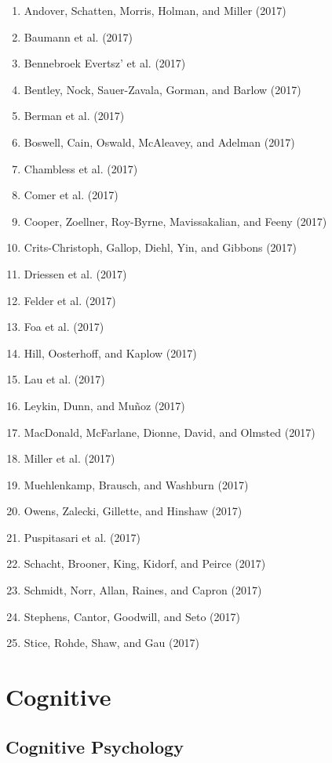 \documentclass[english,man]{apa6}
\providecommand{\tightlist}{%
  \setlength{\itemsep}{0pt}\setlength{\parskip}{0pt}}
\begin{document}
\begin{enumerate}
\def\labelenumi{\arabic{enumi})}
\tightlist
\item
  Andover, Schatten, Morris, Holman, and Miller (2017)
\item
  Baumann et al. (2017)
\item
  Bennebroek Evertsz' et al. (2017)
\item
  Bentley, Nock, Sauer-Zavala, Gorman, and Barlow (2017)
\item
  Berman et al. (2017)
\item
  Boswell, Cain, Oswald, McAleavey, and Adelman (2017)
\item
  Chambless et al. (2017)
\item
  Comer et al. (2017)
\item
  Cooper, Zoellner, Roy-Byrne, Mavissakalian, and Feeny (2017)
\item
  Crits-Christoph, Gallop, Diehl, Yin, and Gibbons (2017)
\item
  Driessen et al. (2017)
\item
  Felder et al. (2017)
\item
  Foa et al. (2017)
\item
  Hill, Oosterhoff, and Kaplow (2017)
\item
  Lau et al. (2017)
\item
  Leykin, Dunn, and Muñoz (2017)
\item
  MacDonald, McFarlane, Dionne, David, and Olmsted (2017)
\item
  Miller et al. (2017)
\item
  Muehlenkamp, Brausch, and Washburn (2017)
\item
  Owens, Zalecki, Gillette, and Hinshaw (2017)
\item
  Puspitasari et al. (2017)
\item
  Schacht, Brooner, King, Kidorf, and Peirce (2017)
\item
  Schmidt, Norr, Allan, Raines, and Capron (2017)
\item
  Stephens, Cantor, Goodwill, and Seto (2017)
\item
  Stice, Rohde, Shaw, and Gau (2017)
\end{enumerate}

\section{Cognitive}\label{cognitive}

\subsection{Cognitive Psychology}\label{cognitive-psychology}
\end{document}

